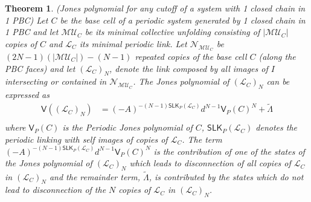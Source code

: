 \documentclass{article}
\newtheorem{theorem}{Theorem}[section]
\begin{document}
\begin{theorem} (Jones polynomial for any cutoff of a system with 1 closed chain in 1 PBC)
Let $C$ be the base cell of a periodic system generated by 1 closed chain in 1 PBC and let $\mathcal{MU}_C$ be its minimal collective unfolding consisting of $|\mathcal{MU}_C|$ copies of $C$ and $\mathcal{L}_C$ its minimal periodic link. Let $\mathcal{N}_{\mathcal{MU}_C}$ be $(2N-1)( |\mathcal{MU}_C|) - (N-1)$ repeated copies of the base cell $C$ (along the PBC faces) and let $(\mathcal{L}_{C})_N$, denote the link composed by all images of $I$ intersecting or contained in $\mathcal{N}_{\mathcal{MU}_C}$.  The Jones polynomial of $(\mathcal{L}_C)_{N}$ can be expressed as
\begin{equation}
    \begin{split}\displaystyle
        \mathsf{V}\left((\mathcal{L}_C)_{N}\right)  &=(-A)^{-(N-1)\mathsf{SLK}_P(\mathcal{L}_C)} d^{N-1} {\mathsf{V}_P(C)}^N + \tilde{\Lambda}\\
    \end{split}
    \label{VHN-exp}
\end{equation}
\noindent where ${\mathsf{V}_P(C)}$ is the Periodic Jones polynomial of $C$, $\mathsf{SLK}_P(\mathcal{L}_C)$ denotes the periodic linking with self images of copies of $\mathcal{L}_C$. The term $(-A)^{-(N-1)\mathsf{SLK}_P(\mathcal{L}_C)} d^{N-1} {\mathsf{V}_P(C)}^N$ is the contribution of one of the states of the Jones polynomial of $(\mathcal{L}_C)_{N}$ which leads to disconnection of all copies of $\mathcal{L}_{C}$ in $(\mathcal{L}_{C})_N$ and the remainder term, $\tilde{\Lambda}$, is contributed by the states which do not lead to disconnection of the $N$ 
 copies of $\mathcal{L}_{C}$ in $(\mathcal{L}_{C})_N$.
\label{corr1PBCjones}
\end{theorem}
\end{document}
